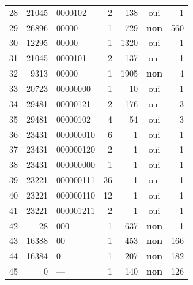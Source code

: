 \begin{longtable}{rrlrrcr}
28 & 21045 & 0000102 & 2 & 138 & oui & 1\\
29 & 26896 & 00000 & 1 & 729 & \textbf{non} & 560\\
30 & 12295 & 00000 & 1 & 1320 & oui & 1\\
31 & 21045 & 0000101 & 2 & 137 & oui & 1\\
32 & 9313 & 00000 & 1 & 1905 & \textbf{non} & 4\\
33 & 20723 & 00000000 & 1 & 10 & oui & 1\\
34 & 29481 & 00000121 & 2 & 176 & oui & 3\\
35 & 29481 & 00000102 & 4 & 54 & oui & 3\\
36 & 23431 & 000000010 & 6 & 1 & oui & 1\\
37 & 23431 & 000000120 & 2 & 1 & oui & 1\\
38 & 23431 & 000000000 & 1 & 1 & oui & 1\\
39 & 23221 & 000000111 & 36 & 1 & oui & 1\\
40 & 23221 & 000000110 & 12 & 1 & oui & 1\\
41 & 23221 & 000001211 & 2 & 1 & oui & 1\\
42 & 28 & 000 & 1 & 637 & \textbf{non} & 1\\
43 & 16388 & 00 & 1 & 453 & \textbf{non} & 166\\
44 & 16384 & 0 & 1 & 207 & \textbf{non} & 182\\
45 & 0 & --- & 1 & 140 & \textbf{non} & 126\\
\bottomrule\end{longtable}

